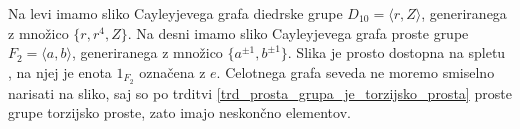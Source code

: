 \begin{primer}
Na levi imamo sliko Cayleyjevega grafa diedrske grupe $D_{10} = \langle r, Z \rangle$, generiranega z množico $\{ r, r^4 ,Z \}$. Na desni imamo sliko Cayleyjevega grafa proste grupe $F_2 = \langle a, b \rangle$, generiranega z množico $\{ a^{\pm 1}, b^{\pm 1} \}$. Slika je prosto dostopna na spletu \cite{wikipedia_cayley_graph},
na njej je enota $1_{F_2}$ označena z $e$. Celotnega grafa seveda ne moremo smiselno narisati na sliko, saj so po trditvi \ref{trd_prosta_grupa_je_torzijsko_prosta} proste grupe torzijsko proste, zato imajo neskončno elementov. 

\begin{figure}[h]
    \centering
    \begin{minipage}[t]{0.45\textwidth}
        \centering
\end{minipage}
\end{figure}
\end{primer}
